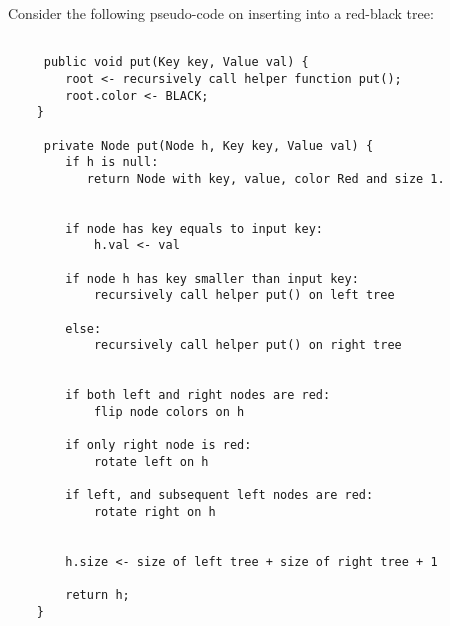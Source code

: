 Consider the following pseudo-code on inserting into a red-black tree:
\begin{lstlisting}

     public void put(Key key, Value val) {
        root <- recursively call helper function put();
        root.color <- BLACK;
    }
    
     private Node put(Node h, Key key, Value val) { 
        if h is null: 
           return Node with key, value, color Red and size 1. 
           
           
        if node has key equals to input key: 
            h.val <- val
            
        if node h has key smaller than input key: 
            recursively call helper put() on left tree
    
        else: 
            recursively call helper put() on right tree
            

        if both left and right nodes are red: 
            flip node colors on h 
            
        if only right node is red: 
            rotate left on h 
        
        if left, and subsequent left nodes are red: 
            rotate right on h 
            
            
        h.size <- size of left tree + size of right tree + 1
       
        return h;
    }

\end{lstlisting}